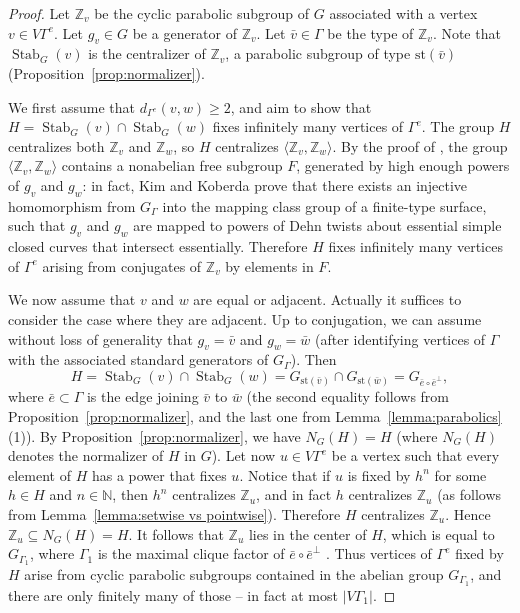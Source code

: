 \documentclass[JEP,XML,SOM,Unicode,NoFloatCountersInSection,published]{cedram}
\theoremstyle{plain}
\theoremstyle{definition}
\newcommand{\Stab}{\operatorname{Stab}}
\newcommand{\st}{\mathrm{st}}
\begin{document}
\begin{proof}
Let $\mathbb Z_v$ be the cyclic parabolic subgroup of $G$ associated with a vertex $v\in V\Gamma^e$. Let $g_v\in G$ be a generator of $\mathbb Z_v$. Let $\bar v\in\Gamma$ be the type of $\mathbb Z_v$. Note that $\Stab_G(v)$ is the centralizer of $\mathbb Z_v$, a parabolic subgroup of type $\st(\bar v)$ (Proposition~\ref{prop:normalizer}).

We first assume that $d_{\Gamma^e}(v,w)\ge 2$, and aim to show that $H=\Stab_G(v)\cap\Stab_G(w)$ fixes infinitely many vertices of $\Gamma^e$. The group $H$ centralizes both $\mathbb Z_v$ and $\mathbb Z_w$, so $H$ centralizes $\langle \mathbb Z_v,\mathbb Z_w\rangle$. By the proof of \cite[Th.\,1.3]{kim2013embedability}, the group $\langle \mathbb Z_v,\mathbb Z_w\rangle$ contains a nonabelian free subgroup $F$, generated by high enough powers of $g_v$ and $g_w$: in fact, Kim and Koberda prove that there exists an injective homomorphism from $G_\Gamma$ into the mapping class group of a finite-type surface, such that $g_v$ and $g_w$ are mapped to powers of Dehn twists about essential simple closed curves that intersect essentially. Therefore $H$ fixes infinitely many vertices of $\Gamma^e$ arising from conjugates of $\mathbb Z_v$ by elements in $F$.

We now assume that $v$ and $w$ are equal or adjacent. Actually it suffices to consider the case where they are adjacent. Up to conjugation, we can assume without loss of generality that $g_v=\bar v$ and $g_w=\bar w$ (after identifying vertices of $\Gamma$ with the associated standard generators of $G_\Gamma$). Then
\[
H=\Stab_G(v)\cap\Stab_G(w)=G_{\st(\bar v)}\cap G_{\st(\bar w)}=G_{\bar e\circ \bar e^\perp},
\]
where $\bar e\subset \Gamma$ is the edge joining $\bar v$ to $\bar w$ (the second equality follows from Proposition~\ref{prop:normalizer}, and the last one from Lemma~\ref{lemma:parabolics}(1)). By Proposition~\ref{prop:normalizer}, we have \hbox{$N_G(H)\!=\!H$} (where $N_G(H)$ denotes the normalizer of $H$ in $G$). Let now $u\in V\Gamma^e$ be a vertex such that every element of $H$ has a power that fixes $u$. Notice that if $u$ is fixed by $h^n$ for some $h\in H$ and $n\in\mathbb{N}$, then $h^n$ centralizes $\mathbb Z_u$, and in fact $h$ centralizes $\mathbb Z_u$ (as follows from Lemma~\ref{lemma:setwise vs pointwise}). Therefore $H$ centralizes $\mathbb Z_u$. Hence $\mathbb Z_u\subseteq N_G(H)=H$. It follows that $\mathbb Z_u$ lies in the center of $H$, which is equal to $G_{\Gamma_1}$, where $\Gamma_1$ is the maximal clique factor of $\bar e\circ \bar e^\perp$ \cite{Ser}. Thus vertices of $\Gamma^e$ fixed by $H$ arise from cyclic parabolic subgroups contained in the abelian group $G_{\Gamma_1}$, and there are only finitely many of those -- in fact at most $|V\Gamma_1|$.
\end{proof}
\end{document}
